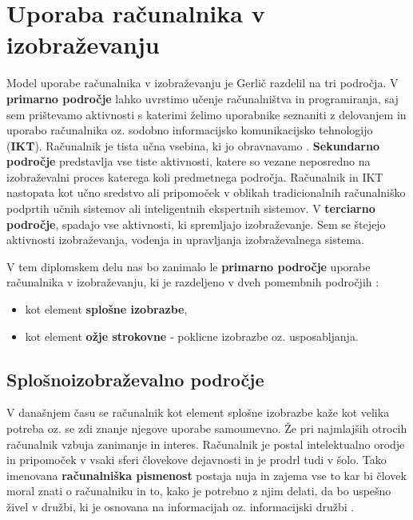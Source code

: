 
\section{Uporaba računalnika v izobraževanju}
\label{sec:uporaba-raunalnika-v}

Model uporabe računalnika v izobraževanju je Gerlič \cite{gerlic_2000}
razdelil na tri področja. V \textbf{primarno področje} lahko uvrstimo
učenje računalništva in programiranja, saj sem prištevamo aktivnosti s
katerimi želimo uporabnike seznaniti z delovanjem in uporabo
računalnika oz. sodobno informacijsko komunikacijsko tehnologijo
(\textbf{IKT}). Računalnik je tista učna vsebina, ki jo obravnavamo
\cite{model_uporabe_rac_izo-web}. \textbf{Sekundarno področje}
predstavlja vse tiste aktivnosti, katere so vezane neposredno na
izobraževalni proces katerega koli predmetnega področja. Računalnik in
IKT nastopata kot učno sredstvo ali pripomoček v oblikah
tradicionalnih računalniško podprtih učnih sistemov ali inteligentnih
ekspertnih sistemov. V \textbf{terciarno področje}, spadajo vse
aktivnosti, ki spremljajo izobraževanje. Sem se štejejo aktivnosti
izobraževanja, vodenja in upravljanja izobraževalnega sistema.

V tem diplomskem delu nas bo zanimalo le \textbf{primarno področje}
uporabe računalnika v izobraževanju, ki je razdeljeno v dveh pomembnih
področjih \cite{gerlic_2000}:

\begin{itemize}
\tightlist
\item kot element \textbf{splošne izobrazbe},
\item kot element \textbf{ožje strokovne} - poklicne izobrazbe
  oz. usposabljanja.
\end{itemize}

\subsection{Splošnoizobraževalno področje}
\label{sec:spološnoiz_področje}

V današnjem času se računalnik kot element splošne izobrazbe kaže kot
velika potreba oz. se zdi znanje njegove uporabe samoumevno. Že pri
najmlajših otrocih računalnik vzbuja zanimanje in interes.  Računalnik
je postal intelektualno orodje in pripomoček v vsaki sferi človekove
dejavnosti in je prodrl tudi v šolo. Tako imenovana \textbf{računalniška
  pismenost} postaja nuja in zajema vse to kar bi človek moral znati o
računalniku in to, kako je potrebno z njim delati, da bo uspešno živel
v družbi, ki je osnovana na informacijah oz. informacijski družbi
\cite{klemencic_2011}.

